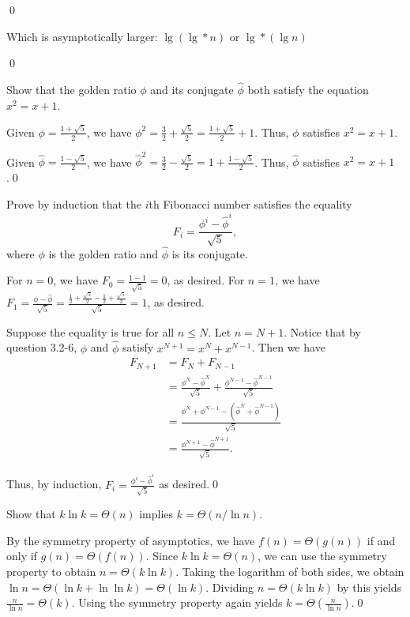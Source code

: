 \sol \qed

 Which is asymptotically larger: $\lg(\lg * n)$ or $\lg * (\lg n)$

\sol \qed

 Show that the golden ratio $\phi$ and its conjugate $\hat{\phi}$ both satisfy the equation $x^2 = x + 1$.

\sol Given $\phi = \frac{1 + \sqrt{5}}{2}$, we have $\phi^2 = \frac{3}{2} + \frac{\sqrt{5}}{2} = \frac{1 + \sqrt{5}}{2} + 1$. Thus, $\phi$ satisfies $x^2 = x + 1$.

Given $\hat\phi = \frac{1 - \sqrt{5}}{2}$, we have $\hat\phi^2 = \frac{3}{2} - \frac{\sqrt{5}}{2} = 1 + \frac{1 - \sqrt{5}}{2}$. Thus, $\hat\phi$ satisfies $x^2 = x + 1$.\qed

 Prove by induction that the $i$th Fibonacci number satisfies the equality $$F_i = \frac{\phi^i - \hat{\phi}^i}{\sqrt{5}},$$ where $\phi$ is the golden ratio and $\hat{\phi}$ is its conjugate.

\pf For $n = 0$, we have $F_0 = \frac{1 - 1}{\sqrt{5}} = 0$, as desired. For $n = 1$, we have $F_1 = \frac{\phi - \hat\phi}{\sqrt{5}} = \frac{\frac{1}{2} + \frac{\sqrt{5}}{2} - \frac{1}{2} + \frac{\sqrt{5}}{2}}{\sqrt{5}} = 1$, as desired.

Suppose the equality is true for all $n \leq N$. Let $n = N+1$. Notice that by question 3.2-6, $\phi$ and $\hat \phi$ satisfy $x^{N+1} = x^N + x^{N-1}$. Then we have
\begin{align*}
    F_{N+1} &= F_N + F_{N-1} \\
    &= \frac{\phi^N - \hat\phi^N}{\sqrt{5}} + \frac{\phi^{N-1} - \hat\phi^{N-1}}{\sqrt{5}} \\
    &= \frac{\phi^N + \phi^{N-1} - (\hat\phi^N + \hat\phi^{N-1})}{\sqrt{5}} \\
    &= \frac{\phi^{N+1} - \hat\phi^{N+1}}{\sqrt{5}}.
\end{align*}

Thus, by induction, $F_i = \frac{\phi^i - \hat\phi^i}{\sqrt{5}}$ as desired.\qed

 Show that $k \ln k = \Theta(n)$ implies $k = \Theta(n / \ln n)$.

\sol By the symmetry property of asymptotics, we have $f(n) = \Theta(g(n))$ if and only if $g(n) = \Theta(f(n))$. Since $k \ln k = \Theta(n)$, we can use the symmetry property to obtain $n = \Theta(k \ln k)$. Taking the logarithm of both sides, we obtain $\ln n = \Theta(\ln k + \ln \ln k) = \Theta(\ln k)$. Dividing $n = \Theta(k \ln k)$ by this yields $\frac{n}{\ln n} = \Theta(k)$. Using the symmetry property again yields $k = \Theta(\frac{n}{\ln n})$.\qed

